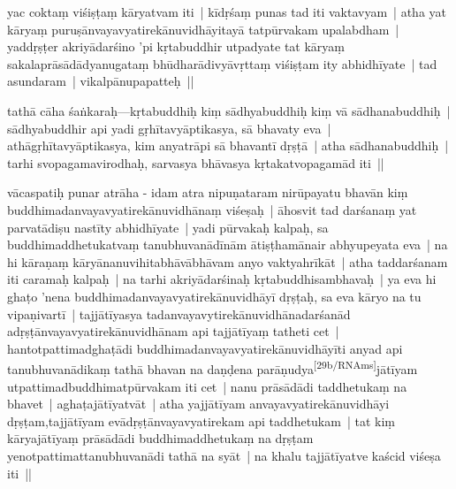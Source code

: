 \documentclass[article,a4paper]{memoir}
\newcommand{\unclear}[1]{($^{?}$#1)}
\begin{document}
	  \pstart yac coktaṃ viśiṣṭaṃ kā\-ryatvam iti | kī\-dṛśaṃ punas tad iti vaktavyam | atha yat kā\-ryaṃ puruṣā\-nvayavyatirekā\-nuvidhā\-yitayā\- tatpū\-rvakam upalabdham | yaddṛṣṭer akriyā\-darśino 'pi kṛtabuddhir utpadyate tat kā\-ryaṃ sakalaprā\-sā\-dā\-dyanugataṃ bhū\-dharā\-divyā\-vṛttaṃ viśiṣṭam ity abhidhī\-yate | tad asundaram | vikalpā\-nupapatteḥ ||
	\pend
      

	  \pstart {}\label{sarit__ratnakīrtinibandhāvali__139880}tathā\- cā\-ha śaṅkaraḥ—kṛtabuddhiḥ kiṃ sā\-dhyabuddhiḥ kiṃ vā\- sā\-dhanabuddhiḥ | sā\-dhyabuddhir api yadi gṛhī\-tavyā\-ptikasya, sā\- bhavaty eva | athā\-gṛhī\-tavyā\-ptikasya, kim anyatrā\-pi sā\- bhavantī\- dṛṣṭā\- | atha sā\-dhanabuddhiḥ | tarhi svopagamavirodhaḥ, sarvasya bhā\-vasya kṛtakatvopagamā\-d iti ||\label{sarit__ratnakīrtinibandhāvali__140214}
	\pend
      

	  \pstart vā\-caspatiḥ punar atrā\-ha - idam atra nipuṇataram nirū\-payatu bhavā\-n kiṃ buddhimadanvayavyatirekā\-nuvidhā\-naṃ viśeṣaḥ | ā\-hosvit tad darśanaṃ yat parvatā\-diṣu nastī\-ty abhidhī\-yate | yadi pū\-rvakaḥ kalpaḥ, sa buddhimaddhetukatvaṃ tanubhuvanā\-dī\-nā\-m ā\-tiṣṭhamā\-nair abhyupeyata eva | na hi kā\-raṇaṃ kā\-ryā\-nanuvihitabhā\-vā\-bhā\-vam anyo vaktyahrī\-kā\-t | atha taddarśanam iti caramaḥ kalpaḥ | na tarhi akriyā\-darśinaḥ kṛtabuddhisambhavaḥ | ya eva hi ghaṭo 'nena buddhimadanvayavyatirekā\-nuvidhā\-yī\- dṛṣṭaḥ, sa eva kā\-ryo na tu vipaṇivartī\- | tajjā\-tī\-yasya tadanvayavytirekā\-nuvidhā\-nadarśanā\-d adṛṣṭā\-nvayavyatirekā\-nuvidhā\-nam api tajjā\-tī\-yaṃ tatheti cet | hantotpattimadghaṭā\-di buddhimadanvayavyatirekā\-nuvidhā\-yī\-ti anyad api tanubhuvanā\-dikaṃ tathā\- bhavan na daṇḍena parā\-ṇudya\leavevmode\textsuperscript{\rmlatinfont\tiny [29b/RNAms]}\label{RNAms-29b}\edtext{te | ghaṭa}{\Afootnote{\unclear{ghaṭa} \cite{}; te | ghaṭa \cite{}  {\rmlatinfont [App type: var]}}}jā\-tī\-yam utpattimadbuddhimatpū\-rvakam iti cet | nanu prā\-sā\-dā\-di taddhetukaṃ na bhavet | aghaṭajā\-tī\-yatvā\-t | atha yajjā\-tī\-yam anvayavyatirekā\-nuvidhā\-yi dṛṣṭam,tajjā\-tī\-yam evā\-dṛṣṭā\-nvayavyatirekam api taddhetukam | tat kiṃ kā\-ryajā\-tī\-yaṃ prā\-sā\-dā\-di buddhimaddhetukaṃ na dṛṣṭam yenotpattimattanubhuvanā\-di tathā\- na syā\-t | na khalu tajjā\-tī\-yatve kaścid viśeṣa iti ||
	\pend
      
\end{document}
